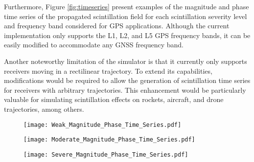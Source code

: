 Furthermore, Figure \ref{fig:timeseries} present examples of the magnitude and phase time series of the propagated scintillation field for each scintillation severity level and frequency band considered for GPS applications. Although the current implementation only supports the L1, L2, and L5 GPS frequency bands, it can be easily modified to accommodate any GNSS frequency band.

Another noteworthy limitation of the simulator is that it currently only supports receivers moving in a rectilinear trajectory. To extend its capabilities, modifications would be required to allow the generation of scintillation time series for receivers with arbitrary trajectories. This enhancement would be particularly valuable for simulating scintillation effects on rockets, aircraft, and drone trajectories, among others.

\begin{figure*}[ht]
    \centering
    \begin{subfigure}[b]{\textwidth}
        \centering
        \texttt{[image: Weak\_Magnitude\_Phase\_Time\_Series.pdf]}
    \end{subfigure}
    \vspace{10pt} %
    \begin{subfigure}[b]{\textwidth}
        \centering
        \texttt{[image: Moderate\_Magnitude\_Phase\_Time\_Series.pdf]}
    \end{subfigure}
    \vspace{10pt} %
    \begin{subfigure}[b]{\textwidth}
        \centering
        \texttt{[image: Severe\_Magnitude\_Phase\_Time\_Series.pdf]}
    \end{subfigure}
    \caption{This figure presents the time series of signal magnitude (top row) and phase evolution (bottom row) for GPS L1, L2, and L5 frequency bands under different scintillation conditions: Severe, Moderate, and Weak. The magnitude is shown in dB as $10\log_{10}{\lvert \psi\left[ \rho_F; m \right]^{2} \rvert}$, while the phase in radians is computed as an unwrapped version of 2 quadrant arctangent of the imaginary and real parts of $\psi\left[ \rho_F; m \right]$. The colors represent different frequencies: blue (L1), red (L2), and green (L5). The top row illustrates the power fluctuations of the scintillation-affected signal, where higher scintillation severity leads to stronger amplitude fading. The bottom row shows the phase evolution, where increased scintillation severity causes larger phase variations, which may lead to cycle slips and phase tracking difficulties in GNSS receivers. The computed $S_4$ indices, displayed in the legend, quantify the scintillation strength for each frequency band. For further details on how these plots were obtained, please refer to \cite{githubGitHubRodrigodelimafgnssscintillationsimulator}}
    \label{fig:timeseries}
\end{figure*}
